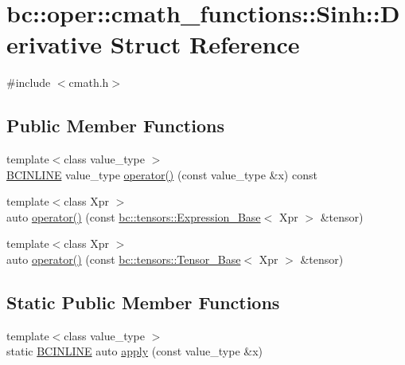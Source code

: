 \hypertarget{structbc_1_1oper_1_1cmath__functions_1_1Sinh_1_1Derivative}{}\section{bc\+:\+:oper\+:\+:cmath\+\_\+functions\+:\+:Sinh\+:\+:Derivative Struct Reference}
\label{structbc_1_1oper_1_1cmath__functions_1_1Sinh_1_1Derivative}


{\ttfamily \#include $<$cmath.\+h$>$}

\subsection*{Public Member Functions}
\begin{DoxyCompactItemize}
\item 
{\footnotesize template$<$class value\+\_\+type $>$ }\\\hyperlink{common_8h_a6699e8b0449da5c0fafb878e59c1d4b1}{B\+C\+I\+N\+L\+I\+NE} value\+\_\+type \hyperlink{structbc_1_1oper_1_1cmath__functions_1_1Sinh_1_1Derivative_acc9c17432d2565c46f5a958c4fcfe827}{operator()} (const value\+\_\+type \&x) const
\item 
{\footnotesize template$<$class Xpr $>$ }\\auto \hyperlink{structbc_1_1oper_1_1cmath__functions_1_1Sinh_1_1Derivative_aabf900f144c91b36808c453c7cb44e50}{operator()} (const \hyperlink{classbc_1_1tensors_1_1Expression__Base}{bc\+::tensors\+::\+Expression\+\_\+\+Base}$<$ Xpr $>$ \&tensor)
\item 
{\footnotesize template$<$class Xpr $>$ }\\auto \hyperlink{structbc_1_1oper_1_1cmath__functions_1_1Sinh_1_1Derivative_a1399f9b23abe88ff7d445be18d26538c}{operator()} (const \hyperlink{classbc_1_1tensors_1_1Tensor__Base}{bc\+::tensors\+::\+Tensor\+\_\+\+Base}$<$ Xpr $>$ \&tensor)
\end{DoxyCompactItemize}
\subsection*{Static Public Member Functions}
\begin{DoxyCompactItemize}
\item 
{\footnotesize template$<$class value\+\_\+type $>$ }\\static \hyperlink{common_8h_a6699e8b0449da5c0fafb878e59c1d4b1}{B\+C\+I\+N\+L\+I\+NE} auto \hyperlink{structbc_1_1oper_1_1cmath__functions_1_1Sinh_1_1Derivative_a6cafb53934c2e5be3d54519ee2f95b0e}{apply} (const value\+\_\+type \&x)
\end{DoxyCompactItemize}


